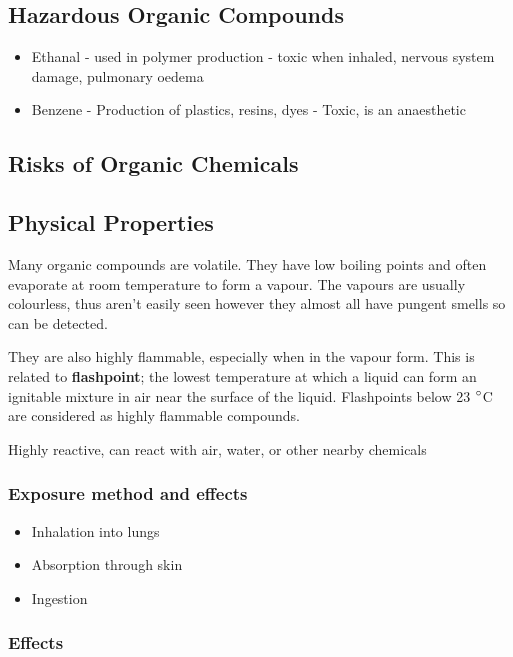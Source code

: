 	\subsection{Hazardous Organic Compounds}
	
		\begin{itemize}
			\item Ethanal - used in polymer production -  toxic when inhaled, nervous system damage, pulmonary oedema
			\item Benzene - Production of plastics, resins, dyes - Toxic, is an anaesthetic
		\end{itemize}
	
	\subsection{Risks of Organic Chemicals}
	
	\subsection{Physical Properties}
		
			Many organic compounds are volatile. They have low boiling points and often evaporate at room temperature to form a vapour. The vapours are usually colourless, thus aren't easily seen however they almost all have pungent smells so can be detected.

			They are also highly flammable, especially when in the vapour form. This is related to \textbf{flashpoint}; the lowest temperature at which a liquid can form an ignitable mixture in air near the surface of the liquid. Flashpoints below 23 $\degree$C are considered as highly flammable compounds.

			Highly reactive, can react with air, water, or other nearby chemicals

			\subsubsection{Exposure method and effects}
			
				\begin{itemize}
					\item Inhalation into lungs
					\item Absorption through skin
					\item Ingestion
				\end{itemize}

			\subsubsection{Effects}
			
